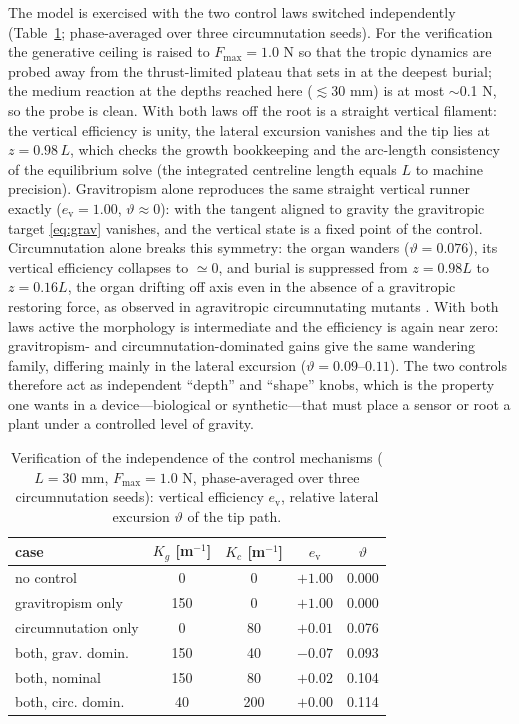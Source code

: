 \documentclass[preprint,12pt]{elsarticle}
\begin{document}
The model is exercised with the two control laws switched independently
(Table~\ref{tab:control}; phase-averaged over three circumnutation seeds).
For the verification the generative ceiling is raised to $F_{\max}=1.0$ N so
that the tropic dynamics are probed away from the thrust-limited plateau that
sets in at the deepest burial; the medium reaction at the depths reached
here ($\lesssim$30 mm) is at most $\sim$0.1 N, so the probe is
clean. With both laws off the root is a straight vertical filament: the
vertical efficiency is unity, the lateral excursion vanishes and the tip
lies at $z=0.98\,L$, which checks the growth bookkeeping and the
arc-length consistency of the equilibrium solve (the integrated centreline
length equals $L$ to machine precision). Gravitropism alone reproduces the
same straight vertical runner exactly ($e_\mathrm{v}=1.00$, $\vartheta
\approx0$): with the tangent aligned to gravity the gravitropic target
\eqref{eq:grav} vanishes, and the vertical state is a fixed point of the
control. Circumnutation alone breaks this symmetry: the organ wanders
($\vartheta=0.076$), its vertical efficiency collapses to $\simeq0$, and
burial is suppressed from $z=0.98L$ to $z=0.16L$, the organ drifting off axis
even in the absence of a gravitropic restoring force, as observed in
agravitropic circumnutating mutants \cite{porat2024}. With both laws active
the morphology is intermediate and the efficiency is again near zero:
gravitropism- and circumnutation-dominated gains give the same wandering
family, differing mainly in the lateral excursion ($\vartheta=0.09$--$0.11$).
The two controls therefore act as independent ``depth'' and ``shape'' knobs,
which is the property one wants in a device---biological or synthetic---that
must place a sensor or root a plant under a controlled level of gravity.

\begin{table}[t]
\centering
\caption{Verification of the independence of the control mechanisms
($L=30$ mm, $F_{\max}=1.0$ N, phase-averaged over three circumnutation
seeds): vertical efficiency $e_\mathrm{v}$, relative lateral excursion
$\vartheta$ of the tip path.}
\label{tab:control}
\begin{tabular}{lcccc}
\toprule
case & $K_g$ [m$^{-1}$] & $K_c$ [m$^{-1}$] & $e_\mathrm{v}$ & $\vartheta$ \\
\midrule
no control          & 0   & 0   & $+1.00$ & 0.000 \\
gravitropism only   & 150 & 0   & $+1.00$ & 0.000 \\
circumnutation only & 0   & 80  & $+0.01$ & 0.076 \\
both, grav. domin.  & 150 & 40  & $-0.07$ & 0.093 \\
both, nominal       & 150 & 80  & $+0.02$ & 0.104 \\
both, circ. domin.  & 40  & 200 & $+0.00$ & 0.114 \\
\bottomrule
\end{tabular}
\end{table}
\end{document}
